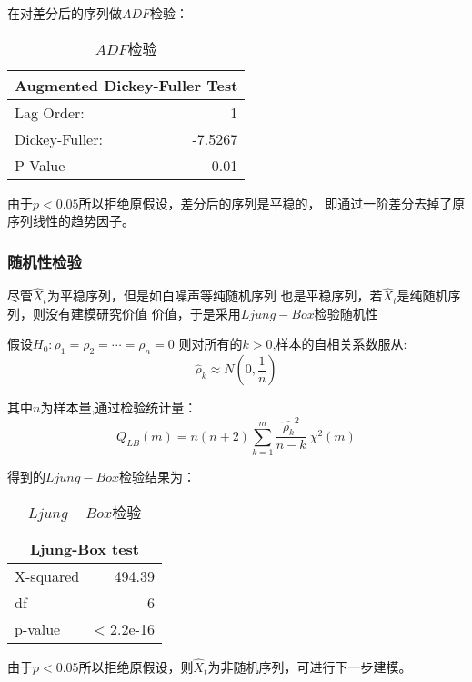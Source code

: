 \documentclass[12pt,a4paper]{nmmcm}
\begin{document}
在对差分后的序列做\(ADF\)检验：
\begin{table}[H]
  \centering
  \caption{\(ADF\)检验}
    \begin{tabular}{l|r}
    \multicolumn{2}{c}{ Augmented Dickey-Fuller Test} \\
    \hline
    Lag Order: & 1 \\
    Dickey-Fuller: & -7.5267\\
    P Value  & 0.01 \\
    \end{tabular}%
  \label{tab:ADF_diff}%
\end{table}%

由于\(p<0.05\)所以拒绝原假设，差分后的序列是平稳的，
即通过一阶差分去掉了原序列线性的趋势因子。

\subsubsection*{随机性检验}
尽管\(\hat{X}_t\)为平稳序列，但是如白噪声等纯随机序列
也是平稳序列，若\(\hat{X}_t\)是纯随机序列，则没有建模研究价值
价值，于是采用\(Ljung-Box\)检验随机性

假设\(H_0:\rho _1 = \rho _2 = \cdots = \rho _n = 0\)
则对所有的\(k>0\),样本的自相关系数服从:
\begin{equation}
  \hat{\rho}_k \approx N(0,\frac{1}{n})
\end{equation}

其中\(n\)为样本量,通过检验统计量：
\begin{equation}
  Q_{LB}(m) = n (n+2)\sum_{k=1}^{m}{\frac{\hat{\rho_{k}}^2}{n-k}} ~\chi^2(m)
\end{equation}

得到的\(Ljung-Box\)检验结果为：
\begin{table}[H]
  \centering
  \caption{\(Ljung-Box\)检验}
    \begin{tabular}{l|r}
    \multicolumn{2}{c}{Ljung-Box test} \\
    \hline
    X-squared  & \multicolumn{1}{r}{494.39} \\
    df    & \multicolumn{1}{r}{6} \\
    p-value & < 2.2e-16 \\
    \end{tabular}%
  \label{tab:Ljung-Box}%
\end{table}%

由于\(p<0.05\)所以拒绝原假设，则\(\hat{X}_t\)为非随机序列，可进行下一步建模。
\end{document}
